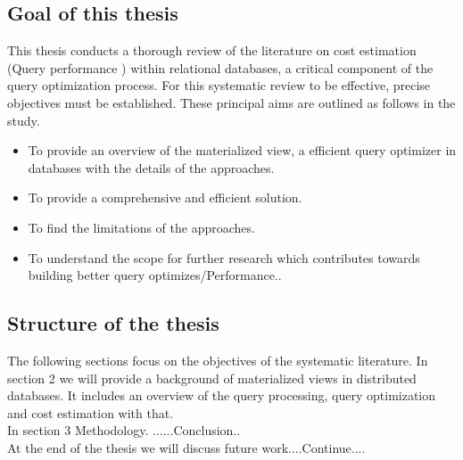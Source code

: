 \subsection{Goal of this thesis}
\normalsize
This thesis conducts a thorough review of the literature on cost estimation (Query performance ) within relational databases, a critical component of the query optimization process. For this systematic review to be effective, precise objectives must be established. These principal aims are outlined as follows in the study.\cite{CostEstimation}
\begin{itemize}
  \item To provide an overview of the materialized view, a efficient  query optimizer in databases with the details of the approaches.
  \item To provide a comprehensive and efficient solution.
  \item To find the limitations of the approaches.
  \item To understand the scope for further research which contributes towards building
better query optimizes/Performance..\cite{CostEstimation}
\end{itemize}
\subsection{Structure of the thesis }The following sections  focus on the objectives of the systematic literature. In section 2 we will provide a background of materialized views  in distributed databases. It includes an overview of the query processing, query optimization and cost estimation with that.\\
In section 3  Methodology. ......Conclusion..\\
At the end of the thesis we  will discuss  future work....Continue....










